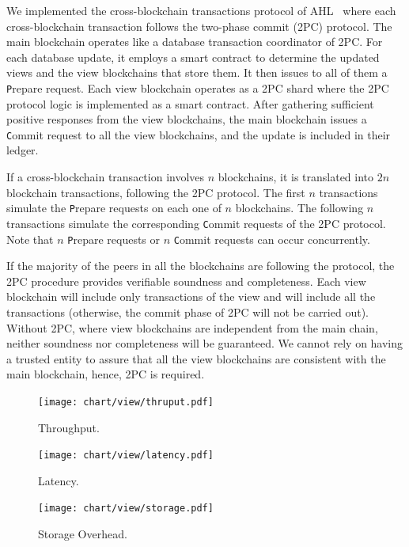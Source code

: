 We implemented the cross-blockchain transactions protocol of AHL~\cite{dang2019towards} where each cross-blockchain transaction follows the two-phase commit (2PC) protocol.
The main blockchain operates like a database transaction coordinator of 2PC.
For each database update, it employs a smart contract to determine the updated views and the view blockchains that store them. It then issues to all of them a  {\texttt Prepare} request. 
Each view blockchain operates as a 2PC shard where the 2PC protocol logic is implemented as a smart contract. %
After gathering sufficient positive responses from the view blockchains, the main blockchain issues a {\texttt Commit} request to all the view blockchains, and the update is included in their ledger. 

If a cross-blockchain transaction involves $n$ blockchains, it is translated into $2n$ blockchain transactions, following the 2PC protocol. The first $n$ transactions simulate the {\texttt Prepare} requests on each one of $n$ blockchains. The following $n$ transactions simulate the corresponding {\texttt Commit} requests of the 2PC protocol. 
Note that $n$ {\texttt Prepare} requests or $n$ {\texttt Commit} requests can occur concurrently. 

If the majority of the peers in all the blockchains are following the protocol, the 2PC procedure provides verifiable soundness and completeness. Each view blockchain will include only transactions of the view and will include all the transactions (otherwise, the commit phase of 2PC will not be carried out).
Without 2PC, where view blockchains are independent from the main chain, neither soundness nor completeness will be guaranteed. We cannot rely on having a trusted entity to assure that all the view blockchains are consistent with the main blockchain, hence, 2PC is required. 


\begin{figure}[tp]
	\begin{minipage}[t]{0.32\textwidth}
		\centering
        \texttt{[image: chart/view/thruput.pdf]}
		\caption{Throughput.}
		\label{chart:view:exp:thruput} 
	\end{minipage}
    \hfill
	\begin{minipage}[t]{0.32\textwidth}
		\centering
        \texttt{[image: chart/view/latency.pdf]}
		\caption{Latency.}
        \label{chart:view:exp:latency}
	\end{minipage}
	\hfill
	\begin{minipage}[t]{0.32\textwidth}
		\centering
    \texttt{[image: chart/view/storage.pdf]}
    \caption{Storage Overhead.}
    \label{chart:view:exp:storage}
	\end{minipage}
\end{figure}



